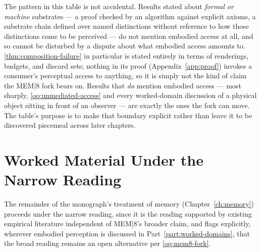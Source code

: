 The pattern in this table is not accidental. Results stated about
\emph{formal or machine} substrates --- a proof checked by an algorithm
against explicit axioms, a substrate chain defined over named
distinctions without reference to how those distinctions come to be
perceived --- do not mention embodied access at all, and so cannot be
disturbed by a dispute about what embodied access amounts to.
\cref{thm:composition-failure} in particular is stated entirely in terms
of renderings, budgets, and discard sets; nothing in its proof
(Appendix~\ref{app:proof}) invokes a consumer's perceptual access to
anything, so it is simply not the kind of claim the MEM|8 fork bears on.
Results that \emph{do} mention embodied access --- most sharply,
\cref{oq:unmediated-access} and every worked-domain discussion of a
physical object sitting in front of an observer --- are exactly the ones
the fork can move. The table's purpose is to make that boundary explicit
rather than leave it to be discovered piecemeal across later chapters.

\section{Worked Material Under the Narrow Reading}

The remainder of the monograph's treatment of memory
(Chapter~\ref{ch:memory}) proceeds under the narrow reading, since it is
the reading supported by existing empirical literature independent of
MEM|8's broader claim, and flags explicitly, wherever embodied perception
is discussed in Part~\ref{part:worked-domains}, that the broad reading
remains an open alternative per \cref{oq:mem8-fork}.
